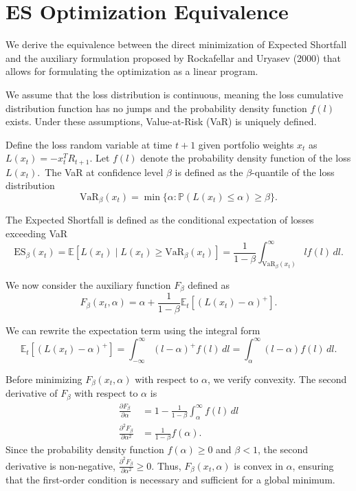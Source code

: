 \chapter{ES Optimization Equivalence} \label{app:es_derivation}

We derive the equivalence between the direct minimization of Expected Shortfall and the auxiliary formulation proposed by Rockafellar and Uryasev (2000) that allows for formulating the optimization as a linear program.

We assume that the loss distribution is continuous, meaning the loss cumulative distribution function has no jumps and the probability density function $f(l)$ exists. Under these assumptions, Value-at-Risk (VaR) is uniquely defined.

Define the loss random variable at time $t+1$ given portfolio weights $x_t$ as $L(x_t) = -x_t^T R_{t+1}$. Let $f(l)$ denote the probability density function of the loss $L(x_t)$.\ The VaR at confidence level $\beta$ is defined as the $\beta$-quantile of the loss distribution
\begin{equation*}
    \text{VaR}_\beta(x_t) = \min \{ \alpha : \mathbb{P}(L(x_t) \le \alpha) \ge \beta \}.
\end{equation*}

The Expected Shortfall is defined as the conditional expectation of losses exceeding VaR
\begin{equation*}
    \text{ES}_\beta(x_t) = \mathbb{E}[L(x_t) \mid L(x_t) \ge \text{VaR}_\beta(x_t)] = \frac{1}{1-\beta} \int_{\text{VaR}_\beta(x_t)}^\infty l f(l) \, dl.
\end{equation*}

We now consider the auxiliary function $F_\beta$ defined as
\begin{equation*}
    F_\beta(x_t, \alpha) = \alpha + \frac{1}{1-\beta} \mathbb{E}_t[(L(x_t) - \alpha)^+].
\end{equation*}


We can rewrite the expectation term using the integral form
\begin{equation*}
    \mathbb{E}_t[(L(x_t) - \alpha)^+] = \int_{-\infty}^\infty (l - \alpha)^+ f(l) \, dl = \int_{\alpha}^\infty (l - \alpha) f(l) \, dl.
\end{equation*}

Before minimizing $F_\beta(x_t, \alpha)$ with respect to $\alpha$, we verify convexity. The second derivative of $F_\beta$ with respect to $\alpha$ is
\begin{align*}
    \frac{\partial F_\beta}{\partial \alpha} &= 1 - \frac{1}{1-\beta} \int_{\alpha}^\infty f(l) \, dl \\
    \frac{\partial^2 F_\beta}{\partial \alpha^2} &= \frac{1}{1-\beta} f(\alpha).
\end{align*}
Since the probability density function $f(\alpha) \ge 0$ and $\beta < 1$, the second derivative is non-negative, $\frac{\partial^2 F_\beta}{\partial \alpha^2} \ge 0$. Thus, $F_\beta(x_t, \alpha)$ is convex in $\alpha$, ensuring that the first-order condition is necessary and sufficient for a global minimum.

